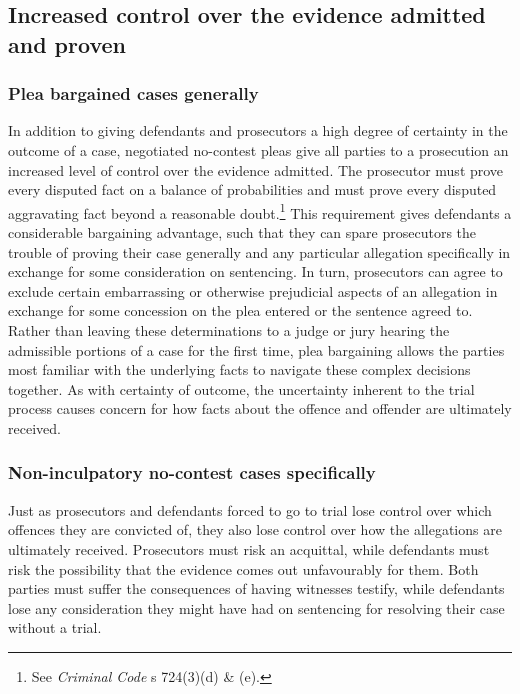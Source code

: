 \subsection{Increased control over the evidence admitted and proven}

\subsubsection{Plea bargained cases generally}

In addition to giving defendants and prosecutors a high degree of certainty in the outcome of a case, negotiated no-contest pleas give all parties to a prosecution an increased level of control over the evidence admitted. The prosecutor must prove every disputed fact on a balance of probabilities and must prove every disputed aggravating fact beyond a reasonable doubt.\footnote{See \textit{Criminal Code} s 724(3)(d) \& (e).} This requirement gives defendants a considerable bargaining advantage, such that they can spare prosecutors the trouble of proving their case generally and any particular allegation specifically in exchange for some consideration on sentencing. In turn, prosecutors can agree to exclude certain embarrassing or otherwise prejudicial aspects of an allegation in exchange for some concession on the plea entered or the sentence agreed to. Rather than leaving these determinations to a judge or jury hearing the admissible portions of a case for the first time, plea bargaining allows the parties most familiar with the underlying facts to navigate these complex decisions together. As with certainty of outcome, the uncertainty inherent to the trial process causes concern for how facts about the offence and offender are ultimately received.

\subsubsection{Non-inculpatory no-contest cases specifically}

Just as prosecutors and defendants forced to go to trial lose control over which offences they are convicted of, they also lose control over how the allegations are ultimately received. Prosecutors must risk an acquittal, while defendants must risk the possibility that the evidence comes out unfavourably for them. Both parties must suffer the consequences of having witnesses testify, while defendants lose any consideration they might have had on sentencing for resolving their case without a trial.

